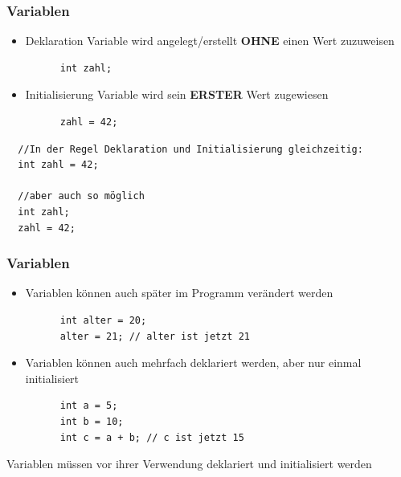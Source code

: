 \documentclass{../../presentation}
\begin{document}
\begin{frame}[fragile]
  \frametitle{Variablen}
  \begin{itemize}
    \item Deklaration \quad \textrightarrow \quad Variable wird angelegt/erstellt \textbf{OHNE} einen Wert zuzuweisen
          \begin{verbatim}
      int zahl;
    \end{verbatim}
          \pause
    \item Initialisierung \quad \textrightarrow \quad Variable wird sein \textbf{ERSTER} Wert zugewiesen
          \begin{verbatim}
      zahl = 42;
    \end{verbatim}
          \pause
  \end{itemize}
  \begin{verbatim}
  //In der Regel Deklaration und Initialisierung gleichzeitig:
  int zahl = 42;

  //aber auch so möglich
  int zahl;
  zahl = 42;
  \end{verbatim}
\end{frame}

\begin{frame}[fragile]
  \frametitle{Variablen}
  \begin{itemize}
    \item Variablen können auch später im Programm verändert werden
          \begin{verbatim}
      int alter = 20;
      alter = 21; // alter ist jetzt 21
    \end{verbatim}
    \item Variablen können auch mehrfach deklariert werden, aber nur einmal initialisiert
          \begin{verbatim}
      int a = 5;
      int b = 10;
      int c = a + b; // c ist jetzt 15
    \end{verbatim}
  \end{itemize}
  \achtung{} Variablen müssen vor ihrer Verwendung deklariert und initialisiert werden
\end{frame}
\end{document}
